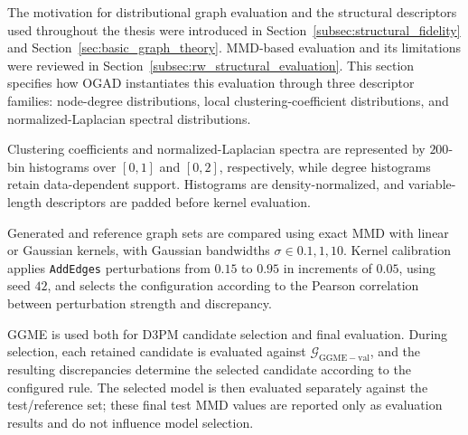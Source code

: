 The motivation for distributional graph evaluation and the structural descriptors used throughout the thesis were introduced in Section~\ref{subsec:structural_fidelity} and Section~\ref{sec:basic_graph_theory}. MMD-based evaluation and its limitations were reviewed in Section~\ref{subsec:rw_structural_evaluation}.  This section specifies how OGAD instantiates this evaluation through three descriptor families: node-degree distributions, local clustering-coefficient distributions, and normalized-Laplacian spectral distributions.

Clustering coefficients and normalized-Laplacian spectra are represented by \(200\)-bin histograms over \([0,1]\) and \([0,2]\), respectively, while degree histograms retain data-dependent support. Histograms are density-normalized, and variable-length descriptors are padded before kernel evaluation.

Generated and reference graph sets are compared using exact MMD with linear or Gaussian kernels, with Gaussian bandwidths \(\sigma\in{0.1,1,10}\). Kernel calibration applies \texttt{AddEdges} perturbations from \(0.15\) to \(0.95\) in increments of \(0.05\), using seed \(42\), and selects the configuration according to the Pearson correlation between perturbation strength and discrepancy.

GGME is used both for D3PM candidate selection and final evaluation. During selection, each retained candidate is evaluated against \(\mathcal{G}_{\mathrm{GGME-val}}\), and the resulting discrepancies determine the selected candidate according to the configured rule. The selected model is then evaluated separately against the test/reference set; these final test MMD values are reported only as evaluation results and do not influence model selection.
